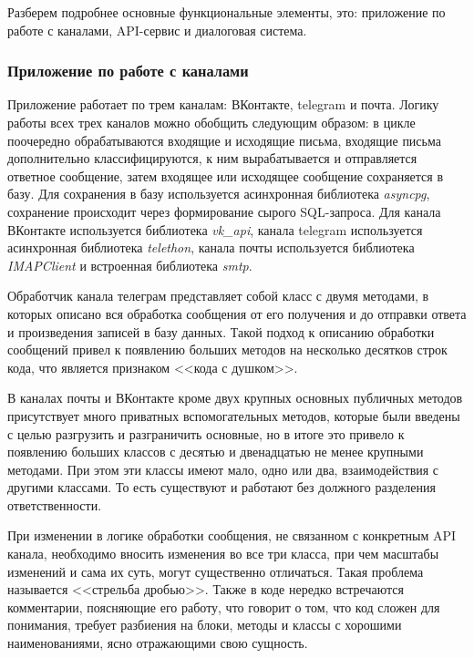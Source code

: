     Разберем подробнее основные функциональные элементы, это:
    приложение по работе с каналами, API-сервис и диалоговая система.
    
    \subsubsection*{Приложение по работе с каналами}
    Приложение работает по трем каналам: ВКонтакте, telegram и почта. Логику работы всех трех каналов можно обобщить
    следующим образом: в цикле поочередно обрабатываются входящие  и исходящие письма, входящие письма дополнительно
    классифицируются, к ним вырабатывается и отправляется ответное сообщение, затем входящее или исходящее сообщение
    сохраняется в базу. Для сохранения в базу используется асинхронная библиотека \textit{asyncpg},
    сохранение происходит через формирование сырого SQL-запроса.
    Для канала ВКонтакте используется библиотека \textit{vk\_api},
    канала telegram используется асинхронная библиотека \textit{telethon},
    канала почты используется библиотека \textit{IMAPClient}\cite{docs.imap} 
    и встроенная библиотека \textit{smtp}.

    Обработчик канала телеграм представляет собой класс с двумя методами,
    в которых описано вся обработка сообщения от его получения и до отправки ответа
    и произведения записей в базу данных. Такой подход к описанию обработки сообщений
    привел к появлению больших методов на несколько десятков строк кода, что является
    признаком <<кода с душком>>.

    В каналах почты и ВКонтакте кроме двух крупных основных публичных методов
    присутствует много приватных вспомогательных методов, которые были введены с
    целью разгрузить и разграничить основные, но в итоге это привело к появлению
    больших классов с десятью и двенадцатью не менее крупными методами.
    При этом эти классы имеют мало, одно или два, взаимодействия с другими классами.
    То есть существуют и работают без должного разделения ответственности.

    При изменении в логике обработки сообщения, не связанном с конкретным API канала,
    необходимо вносить изменения во все три класса, при чем масштабы изменений и
    сама их суть, могут существенно отличаться.
    Такая проблема называется <<стрельба дробью>>.
    Также в коде нередко встречаются комментарии, поясняющие его работу, что говорит
    о том, что код сложен для понимания, требует разбиения на блоки, методы и классы
    с хорошими наименованиями, ясно отражающими свою сущность. \cite{refactoring.fowler}

